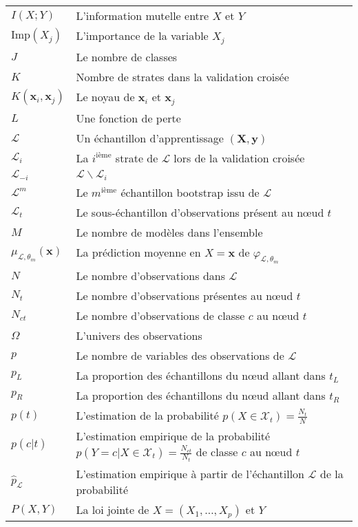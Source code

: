 \begin{tabularx}{\textwidth}{ l X }
$I(X;Y)$ & L'information mutelle entre $X$ et $Y$   \\
$\text{Imp}(X_j)$ & L'importance de la variable $X_j$  \\
$J$ & Le nombre de classes   \\
$K$ & Nombre de strates dans la validation croisée    \\
$K(\mathbf{x}_i, \mathbf{x}_j)$ & Le noyau de $\mathbf{x}_i$ et $\mathbf{x}_j$  \\
$L$ & Une fonction de perte   \\
$\mathcal{L}$ & Un échantillon d'apprentissage $(\mathbf{X}, \mathbf{y})$   \\
$\mathcal{L}_i$ & La $i^\text{ième}$ strate de $\mathcal{L}$ lors de la validation croisée   \\
$\mathcal{L}_{-i}$ & $\mathcal{L} \smallsetminus \mathcal{L}_i$   \\
$\mathcal{L}^m$ & Le $m^\text{ième}$ échantillon bootstrap issu de $\mathcal{L}$   \\
$\mathcal{L}_t$ & Le sous-échantillon d'observations présent au nœud $t$   \\
$M$ & Le nombre de modèles dans l'ensemble   \\
$\mu_{\mathcal{L},\theta_m}(\mathbf{x})$ & La prédiction moyenne en $X = \mathbf{x}$ de $\varphi_{\mathcal{L},\theta_m}$   \\
$N$ & Le nombre d'observations dans $\mathcal{L}$   \\
$N_t$ & Le nombre d'observations présentes au nœud $t$   \\
$N_{ct}$ & Le nombre d'observations de classe $c$ au nœud $t$   \\
$\Omega$ & L'univers des observations   \\
$p$ & Le nombre de variables des observations de $\mathcal{L}$   \\
$p_L$ & La proportion des échantillons du nœud allant dans $t_L$   \\
$p_R$ & La proportion des échantillons du nœud allant dans $t_R$   \\
$p(t)$ & L'estimation de la probabilité $p(X \in \mathcal{X}_t)=\tfrac{N_t}{N}$   \\
$p(c|t)$ & L'estimation empirique de la probabilité $p(Y=c | X \in \mathcal{X}_t)=\tfrac{N_{ct}}{N_t}$ de classe $c$ au nœud $t$   \\
$\widehat{p}_\mathcal{L}$ & L'estimation empirique à partir de l'échantillon $\mathcal{L}$ de la probabilité   \\
$P(X,Y)$ & La loi jointe de $X=(X_1,\dots,X_p)$ et $Y$   \\

\end{tabularx}
